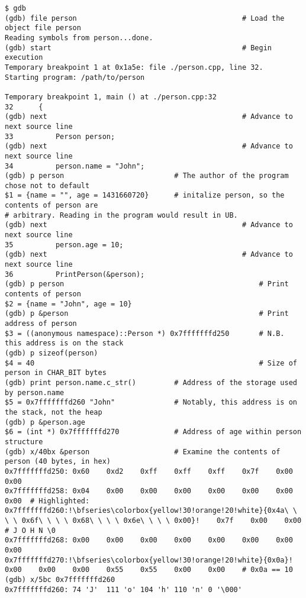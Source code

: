 \documentclass[11pt, letterpaper]{article} %
\begin{document}
\begin{lstlisting}[style=labreportstyle-sh,escapechar=!]
$ gdb
(gdb) file person                                       # Load the object file person
Reading symbols from person...done.
(gdb) start                                             # Begin execution
Temporary breakpoint 1 at 0x1a5e: file ./person.cpp, line 32.
Starting program: /path/to/person 

Temporary breakpoint 1, main () at ./person.cpp:32
32      {
(gdb) next                                              # Advance to next source line
33          Person person;
(gdb) next                                              # Advance to next source line
34          person.name = "John";
(gdb) p person                          # The author of the program chose not to default
$1 = {name = "", age = 1431660720}      # initalize person, so the contents of person are
# arbitrary. Reading in the program would result in UB.
(gdb) next                                              # Advance to next source line
35          person.age = 10;
(gdb) next                                              # Advance to next source line
36          PrintPerson(&person);
(gdb) p person                                              # Print contents of person
$2 = {name = "John", age = 10}
(gdb) p &person                                             # Print address of person
$3 = ((anonymous namespace)::Person *) 0x7fffffffd250       # N.B. this address is on the stack
(gdb) p sizeof(person)
$4 = 40                                                     # Size of person in CHAR_BIT bytes
(gdb) print person.name.c_str()         # Address of the storage used by person.name
$5 = 0x7fffffffd260 "John"              # Notably, this address is on the stack, not the heap
(gdb) p &person.age
$6 = (int *) 0x7fffffffd270             # Address of age within person structure
(gdb) x/40bx &person                    # Examine the contents of person (40 bytes, in hex)
0x7fffffffd250: 0x60    0xd2    0xff    0xff    0xff    0x7f    0x00    0x00
0x7fffffffd258: 0x04    0x00    0x00    0x00    0x00    0x00    0x00    0x00  # Highlighted:
0x7fffffffd260:!\bfseries\colorbox{yellow!30!orange!20!white}{0x4a\ \ \ \ 0x6f\ \ \ \ 0x68\ \ \ \ 0x6e\ \ \ \ 0x00}!    0x7f    0x00    0x00    # J O H N \0
0x7fffffffd268: 0x00    0x00    0x00    0x00    0x00    0x00    0x00    0x00
0x7fffffffd270:!\bfseries\colorbox{yellow!30!orange!20!white}{0x0a}!    0x00    0x00    0x00    0x55    0x55    0x00    0x00    # 0x0a == 10
(gdb) x/5bc 0x7fffffffd260
0x7fffffffd260: 74 'J'  111 'o' 104 'h' 110 'n' 0 '\000'

\end{lstlisting}
\end{document}
